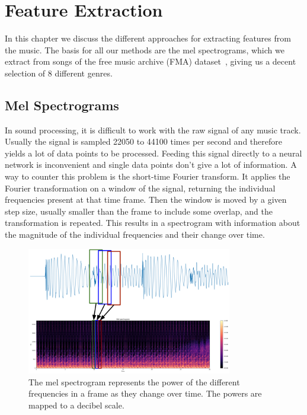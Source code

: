 \chapter{Feature Extraction}
    In this chapter we discuss the different approaches for extracting features from the music. The basis for all our methods are the mel spectrograms, which we extract from songs of the free music archive (FMA) dataset~\cite{FMA}, giving us a decent selection of 8 different genres.

\section{Mel Spectrograms}
    In sound processing, it is difficult to work with the raw signal of any music track.
    Usually the signal is sampled 22050 to 44100 times per second and therefore yields a lot of data points to be processed. 
    Feeding this signal directly to a neural network is inconvenient and single data points don't give a lot of information.
    A way to counter this problem is the short-time Fourier transform. 
    It applies the Fourier transformation on a window of the signal, returning the individual frequencies present at that time frame. 
    Then the window is moved by a given step size, usually smaller than the frame to include some overlap, and the transformation is repeated.
    This results in a spectrogram with information about the magnitude of the individual frequencies and their change over time.\\
    \begin{figure}[!b]
        \centering
        \includegraphics[width=0.8\textwidth]{images/sigToMels.png}
        \caption{The mel spectrogram represents the power of the different frequencies in a frame as they change over time. The powers are mapped to a decibel scale.}
        \label{mel}
    \end{figure}
